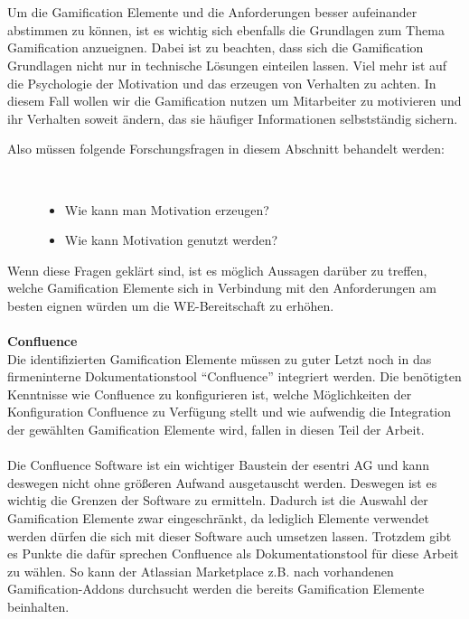 \documentclass[a4paper,12pt]{scrartcl}
\begin{document}
\\\\
Um die Gamification Elemente und die Anforderungen besser aufeinander abstimmen zu können, ist es wichtig sich ebenfalls die Grundlagen zum Thema Gamification anzueignen. Dabei ist zu beachten, dass sich die Gamification Grundlagen nicht nur in technische Lösungen einteilen lassen. Viel mehr ist auf die Psychologie der Motivation und das erzeugen von Verhalten zu achten. In diesem Fall wollen wir die Gamification nutzen um Mitarbeiter zu motivieren und ihr Verhalten soweit ändern, das sie häufiger Informationen selbstständig sichern.
\begin{description}
   \item[Also müssen folgende Forschungsfragen in diesem Abschnitt behandelt werden:]~\par
   \begin{itemize}
      \item Wie kann man Motivation erzeugen?
      \item Wie kann Motivation genutzt werden?
   \end{itemize}
\end{description}
Wenn diese Fragen geklärt sind, ist es möglich Aussagen darüber zu treffen, welche Gamification Elemente sich in Verbindung mit den Anforderungen am besten eignen würden um die WE-Bereitschaft zu erhöhen.
\\\\
\textbf{Confluence}\\
Die identifizierten Gamification Elemente müssen zu guter Letzt noch in das firmeninterne Dokumentationstool \enquote{Confluence} integriert werden. Die benötigten Kenntnisse wie Confluence zu konfigurieren ist, welche Möglichkeiten der Konfiguration Confluence zu Verfügung stellt und wie aufwendig die Integration der gewählten Gamification Elemente wird, fallen in diesen Teil der Arbeit. 
\\\\
Die Confluence Software ist ein wichtiger Baustein der esentri AG und kann deswegen nicht ohne größeren Aufwand ausgetauscht werden. Deswegen ist es wichtig die Grenzen der Software zu ermitteln. Dadurch ist die Auswahl der Gamification Elemente zwar eingeschränkt, da lediglich Elemente verwendet werden dürfen die sich mit dieser Software auch umsetzen lassen. Trotzdem gibt es Punkte die dafür sprechen Confluence als Dokumentationstool für diese Arbeit zu wählen. So kann der Atlassian Marketplace z.B. nach vorhandenen Gamification-Addons durchsucht werden die bereits Gamification Elemente beinhalten.
\end{document}
